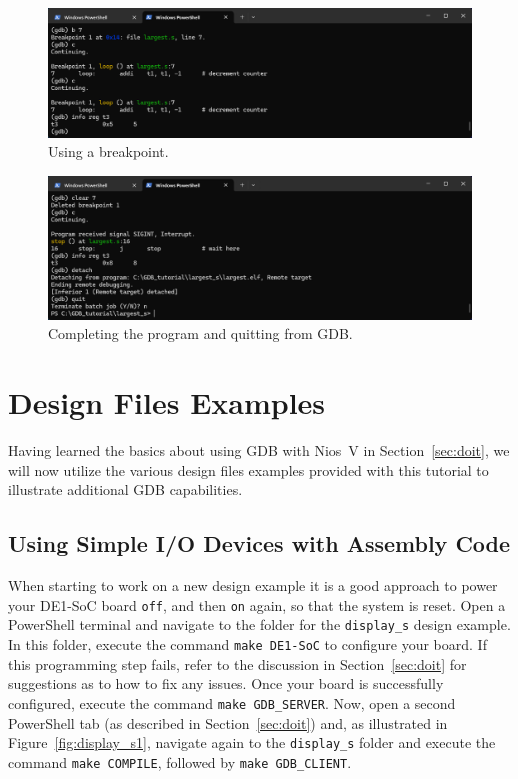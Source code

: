 \documentclass[11pt, twoside, pdftex]{article}
\begin{document}
{\begin{figure}[h]
    \begin{center}
        \includegraphics[scale=.6]{figures/gdb3.png}
        \caption{Using a breakpoint.}
        \label{fig:gdb3}
    \end{center}
\end{figure}

\begin{figure}[h]
    \begin{center}
        \includegraphics[scale=.6]{figures/gdb4.png}
        \caption{Completing the program and quitting from GDB.}
        \label{fig:gdb4}
    \end{center}
\end{figure}

\section{Design Files Examples}

Having learned the basics about using GDB with Nios~V in Section~\ref{sec:doit}, we will 
now utilize the various design files examples provided with this tutorial to illustrate
additional GDB capabilities. 

\subsection{Using Simple I/O Devices with Assembly Code}
\label{sec:simpleIO}

When starting to work on a new design example it is a good approach to power your DE1-SoC
board \texttt{off}, and then \texttt{on} again, so that the system is reset.   
Open a PowerShell terminal and navigate to the folder for the \texttt{display\_s} design
example. In this folder, execute the command \texttt{make DE1-SoC} to configure your board. 
If this programming step fails, refer to the discussion in Section~\ref{sec:doit} for
suggestions as to how to fix any issues. Once your board is successfully configured,
execute the command \texttt{make GDB\_SERVER}. Now, open a second
PowerShell tab (as described in Section~\ref{sec:doit}) and, as illustrated in 
Figure~\ref{fig:display_s1}, navigate again to the \texttt{display\_s} folder and 
execute the command \texttt{make COMPILE}, followed by \texttt{make GDB\_CLIENT}.

}
\end{document}
